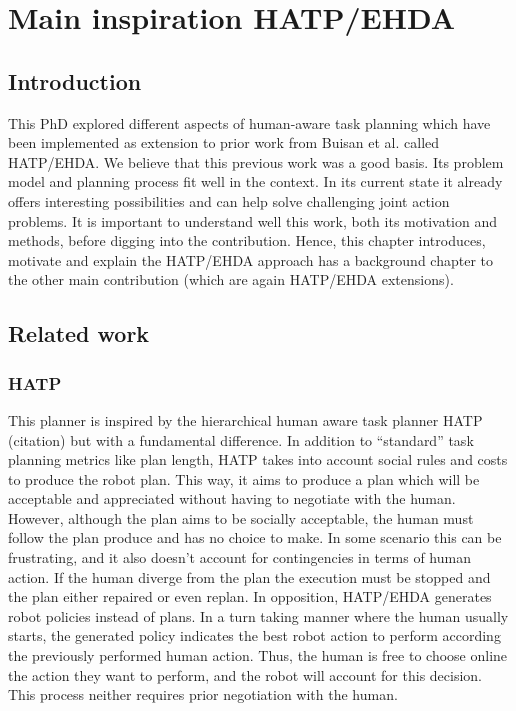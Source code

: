 \ifdefined{}
\else
\setcounter{chapter}{1} %
\dominitoc
\faketableofcontents
\fi

\chapter{Main inspiration HATP/EHDA}
\label{chap:2}
\minitoc

\section{Introduction}

This PhD explored different aspects of human-aware task planning which have been implemented as extension to prior work from Buisan et al. called HATP/EHDA.
We believe that this previous work was a good basis. Its problem model and planning process fit well in the context. In its current state it already offers interesting possibilities and can help solve challenging joint action problems. 
It is important to understand well this work, both its motivation and methods, before digging into the contribution. Hence, this chapter introduces, motivate and explain the HATP/EHDA approach has a background chapter to the other main contribution (which are again HATP/EHDA extensions).

\section{Related work}

\subsection{HATP}
This planner is inspired by the hierarchical human aware task planner HATP (citation) but with a fundamental difference. In addition to ``standard'' task planning metrics like plan length, HATP takes into account social rules and costs to produce the robot plan. This way, it aims to produce a plan which will be acceptable and appreciated without having to negotiate with the human. However, although the plan aims to be socially acceptable, the human must follow the plan produce and has no choice to make. 
In some scenario this can be frustrating, and it also doesn't account for contingencies in terms of human action. If the human diverge from the plan the execution must be stopped and the plan either repaired or even replan. In opposition, HATP/EHDA generates robot policies instead of plans. In a turn taking manner where the human usually starts, the generated policy indicates the best robot action to perform according the previously performed human action. Thus, the human is free to choose online the action they want to perform, and the robot will account for this decision. This process neither requires prior negotiation with the human.  

